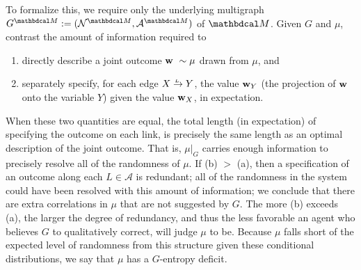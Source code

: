 \documentclass{article}
\newcommand{\N}{\mathcal N}
\newcommand{\Ed}{\mathcal A}
\newcommand{\ed}[3]{#2
	\overset{\smash{\mskip-5mu\raisebox{-1pt}{$\scriptscriptstyle
				#1$}}}{\rightarrow} #3}
\newcommand{\dg}[1]{\mathbdcal #1}
\begin{document}
To formalize this, we require only the underlying multigraph $G^{\dg M} :=
(\N^{\dg M}, \Ed^{\dg M})$ of $\dg M$. 
Given $G$ and $\mu$, contrast the amount of
information required to 
\begin{enumerate}[label=(\alph*)]
	\item directly describe a joint outcome  $\mathbf w ~ \sim \mu$
	drawn from $\mu$, and 
	\item separately specify, for each edge $\ed LXY$, the value
	$\mathbf w_Y$ (the projection of $\mathbf w$ onto the variable
	$Y$) given the value $\mathbf w_X$, in expectation. 
\end{enumerate}
When these two quantities are equal,
the total length (in expectation) of specifying the outcome on each link, is precisely the same length as
an optimal description of the joint outcome. That is, $\mu|_G$ carries enough information to precisely resolve all of the randomness of $\mu$.
%
%
If (b) $>$ (a), then a specification of an outcome along each $L \in \Ed$ is redundant; all of the randomness in the system could have been resolved with this amount of information; we conclude that there are extra correlations in $\mu$ that are not suggested by $G$. 
The more (b) exceeds (a), the larger the degree of redundancy, and thus the less favorable an agent who believes $G$ to qualitatively correct, will judge $\mu$ to be. Because $\mu$ falls short of the expected level of randomness from this structure given these conditional distributions, we say that $\mu$ has a $G$-entropy deficit.
\end{document}
